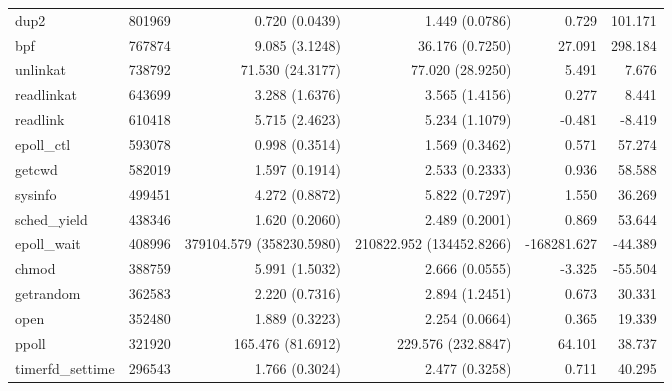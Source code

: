 \begin{longtable}{>{\ttfamily}lrrrrr}
                           dup2 &     801969 &              0.720 (0.0439) &            1.449 (0.0786) &           0.729 &      101.171 \\
                            bpf &     767874 &              9.085 (3.1248) &           36.176 (0.7250) &          27.091 &      298.184 \\
                       unlinkat &     738792 &            71.530 (24.3177) &          77.020 (28.9250) &           5.491 &        7.676 \\
                     readlinkat &     643699 &              3.288 (1.6376) &            3.565 (1.4156) &           0.277 &        8.441 \\
                       readlink &     610418 &              5.715 (2.4623) &            5.234 (1.1079) &          -0.481 &       -8.419 \\
                     epoll\_ctl &     593078 &              0.998 (0.3514) &            1.569 (0.3462) &           0.571 &       57.274 \\
                         getcwd &     582019 &              1.597 (0.1914) &            2.533 (0.2333) &           0.936 &       58.588 \\
                        sysinfo &     499451 &              4.272 (0.8872) &            5.822 (0.7297) &           1.550 &       36.269 \\
                   sched\_yield &     438346 &              1.620 (0.2060) &            2.489 (0.2001) &           0.869 &       53.644 \\
                    epoll\_wait &     408996 &    379104.579 (358230.5980) &  210822.952 (134452.8266) &     -168281.627 &      -44.389 \\
                          chmod &     388759 &              5.991 (1.5032) &            2.666 (0.0555) &          -3.325 &      -55.504 \\
                      getrandom &     362583 &              2.220 (0.7316) &            2.894 (1.2451) &           0.673 &       30.331 \\
                           open &     352480 &              1.889 (0.3223) &            2.254 (0.0664) &           0.365 &       19.339 \\
                          ppoll &     321920 &           165.476 (81.6912) &        229.576 (232.8847) &          64.101 &       38.737 \\
               timerfd\_settime &     296543 &              1.766 (0.3024) &            2.477 (0.3258) &           0.711 &       40.295 \\

\end{longtable}
